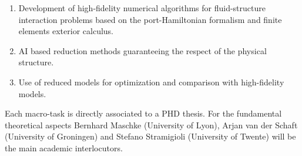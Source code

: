 \documentclass[12pt]{article}
\begin{document}
	\begin{enumerate}
		\item Development of high-fidelity numerical algorithms for fluid-structure interaction problems based on the port-Hamiltonian formalism and finite elements exterior calculus.
		\item AI based reduction methods guaranteeing the respect of the physical structure. 
		\item Use of reduced models for optimization and comparison with high-fidelity models.
	\end{enumerate}
	
	Each macro-task is directly associated to a PHD thesis. For the fundamental theoretical aspects Bernhard Maschke (University of Lyon), Arjan van der Schaft (University of Groningen) and Stefano Stramigioli (University of Twente) will be the main academic interlocutors.
	
\end{document}

